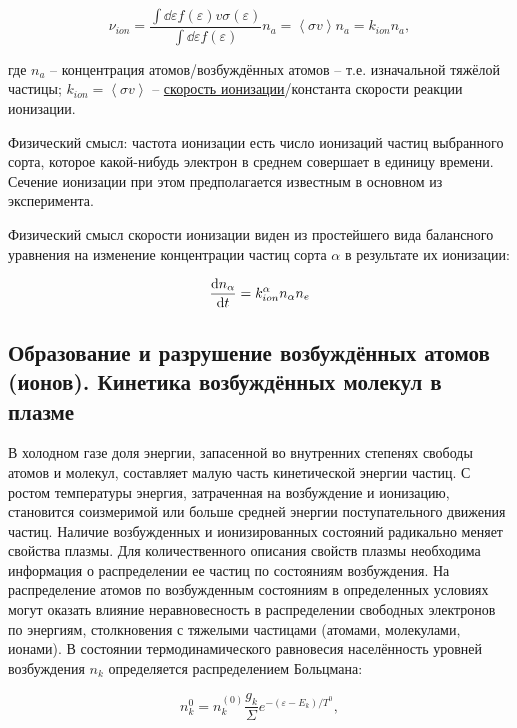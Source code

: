 \documentclass[10pt, a4paper]{article}
\begin{document}
\begin{equation*}
	\nu_{ion} = \frac{\int \dd\varepsilon f(\varepsilon) v \sigma(\varepsilon)}{\int \dd\varepsilon f(\varepsilon)} n_a = \left\langle \sigma v\right\rangle n_a = k_{ion} n_a,
\end{equation*}

где $n_a$ -- концентрация атомов/возбуждённых атомов -- т.е. изначальной тяжёлой частицы; $k_{ion} = \left\langle \sigma v\right\rangle$ -- \uline{скорость ионизации}/константа скорости реакции ионизации.

Физический смысл: частота ионизации есть число ионизаций частиц выбранного сорта, которое какой-нибудь электрон в среднем совершает в единицу времени. Сечение ионизации при этом предполагается известным в основном из эксперимента.

Физический смысл скорости ионизации виден из простейшего вида балансного уравнения на изменение концентрации частиц сорта $\alpha$ в результате их ионизации:

\begin{equation*}
	\dv{n_\alpha}{t} = k_{ion}^\alpha n_\alpha n_e
\end{equation*}

\subsection{Образование и разрушение возбуждённых атомов (ионов). Кинетика возбуждённых молекул в плазме}

В холодном газе доля энергии, запасенной во внутренних степенях свободы атомов и молекул, составляет малую часть кинетической энергии частиц. С ростом температуры энергия, затраченная на возбуждение и ионизацию, становится соизмеримой или больше средней энергии поступательного движения частиц. Наличие возбужденных и ионизированных состояний радикально меняет свойства плазмы. Для количественного описания свойств плазмы необходима информация о распределении ее частиц по состояниям возбуждения. На распределение атомов по возбужденным состояниям в определенных условиях могут оказать влияние неравновесность в распределении свободных электронов по энергиям, столкновения с тяжелыми частицами (атомами, молекулами, ионами). В состоянии термодинамического равновесия населённость уровней возбуждения $n_k$ определяется распределением Больцмана:

\begin{equation*}
	n_k^0 = n_k^{(0)}\frac{g_k}{\Sigma}e^{-(\varepsilon-E_k)/T^0},
\end{equation*}
\end{document}
